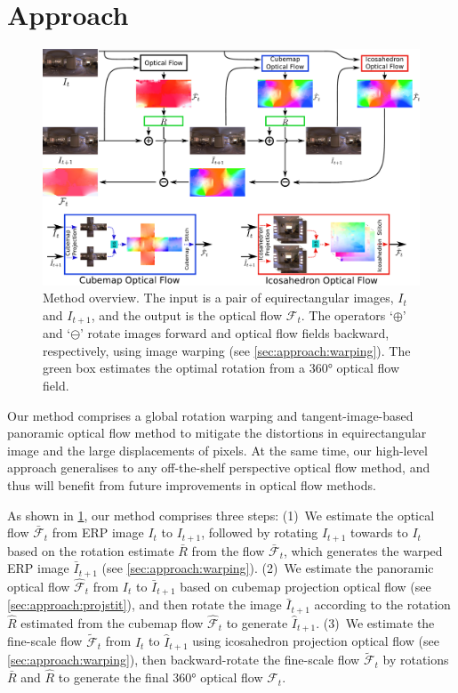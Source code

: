 \section{Approach}
\label{sec:approach}

\begin{figure}%
	\centering
	\includegraphics[width=0.95\linewidth]{images/method_pipeline_1.pdf}
	\caption{Method overview.
		The input is a pair of equirectangular images, $I_t$ and $I_{t+1}$, and the output is the optical flow $\mathcal{F}_t$.
		The operators `$\oplus$' and `$\ominus$' rotate images forward and optical flow fields backward, respectively, using image warping (see \cref{sec:approach:warping}).
		The green box estimates the optimal rotation from a 360° optical flow field.
	}
	\label{fig:approach:pipeline}
\end{figure}

Our method comprises a global rotation warping and tangent-image-based panoramic optical flow method to mitigate the distortions in equirectangular image and the large displacements of pixels.
At the same time, our high-level approach generalises to any off-the-shelf perspective optical flow method, and thus will benefit from future improvements in optical flow methods.


As shown in \cref{fig:approach:pipeline}, our method comprises three steps:
(1)~We estimate the optical flow $\bar{\mathcal{F}}_t$ from ERP image $I_{t}$ to ${I_{t+1}}$, followed by rotating $I_{t+1}$ towards to $I_{t}$ based on the rotation estimate $\bar{R}$ from the flow $\bar{\mathcal{F}}_t$, which generates the warped ERP image ${\bar{I}}_{t+1}$ (see \cref{sec:approach:warping}).
(2)~We estimate the panoramic optical flow ${\hat{\mathcal{F}}}_t$ from $I_{t}$ to ${\bar{I}}_{t+1}$ based on cubemap projection optical flow (see \cref{sec:approach:projstit}), and then rotate the image ${\bar{I}}_{t+1}$ according to the rotation $\hat{R}$ estimated from the cubemap flow ${\hat{\mathcal{F}}}_t$ to generate ${\hat{I}}_{t+1}$.
(3)~We estimate the fine-scale flow $\tilde{\mathcal{F}}_t$ from $I_{t}$ to ${\hat{I}}_{t+1}$ using icosahedron projection optical flow (see \cref{sec:approach:warping}), then backward-rotate the fine-scale flow $\tilde{\mathcal{F}}_t$ by rotations $\bar{R}$ and $\hat{R}$ to generate the final 360° optical flow $\mathcal{F}_t$.


